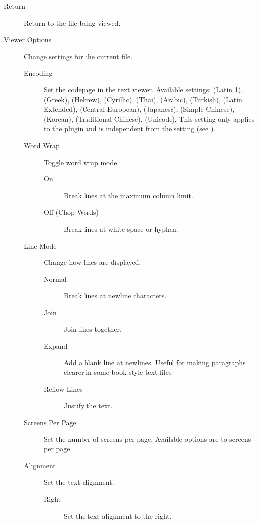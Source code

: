 \begin{description}
\item[Return] Return to the file being viewed.
\item[Viewer Options] Change settings for the current file.
    \begin{description}
    \item[Encoding] Set the codepage in the text viewer.
    Available settings:
     (Latin 1),
     (Greek),
     (Hebrew),
     (Cyrillic),
     (Thai),
     (Arabic),
     (Turkish),
     (Latin Extended),
     (Central European),
     (Japanese),
     (Simple Chinese),
     (Korean),
     (Traditional Chinese),
     (Unicode),
    This setting only applies to the plugin and is independent from the
     setting (see ).
    \item[Word Wrap] Toggle word wrap mode.
        \begin{description}
            \item[On] Break lines at the maximum column limit.
            \item[Off (Chop Words)] Break lines at white space or hyphen.
        \end{description}
    \item[Line Mode] Change how lines are displayed.
        \begin{description}
            \item[Normal] Break lines at newline characters.
            \item[Join] Join lines together.
            \item[Expand] Add a blank line at newlines. Useful for making paragraphs
            clearer in some book style text files.
            \item[Reflow Lines] Justify the text.
        \end{description}
    \item[Screens Per Page] Set the number of screens per page. Available
      options are  to  screens per page.
    \item[Alignment] Set the text alignment.
        \begin{description}
            \item[Right] Set the text alignment to the right.

\end{description}
\end{description}
\end{description}
